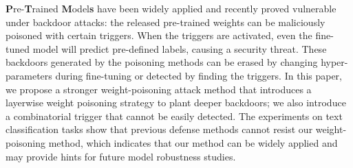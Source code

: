 \textbf{P}re-\textbf{T}rained \textbf{M}odel\textbf{s} have been widely applied and recently proved vulnerable under backdoor attacks: the released pre-trained weights can be maliciously poisoned with certain triggers. When the triggers are activated, even the fine-tuned model will predict pre-defined labels, causing a security threat. These backdoors generated by the poisoning methods can be erased by changing hyper-parameters during fine-tuning or detected by finding the triggers. In this paper, we propose a stronger weight-poisoning attack method that introduces a layerwise weight poisoning strategy to plant deeper backdoors; we also introduce a combinatorial trigger that cannot be easily detected. The experiments on text classification tasks show that previous defense methods cannot resist our weight-poisoning method, which indicates that our method can be widely applied and may provide hints for future model robustness studies.
